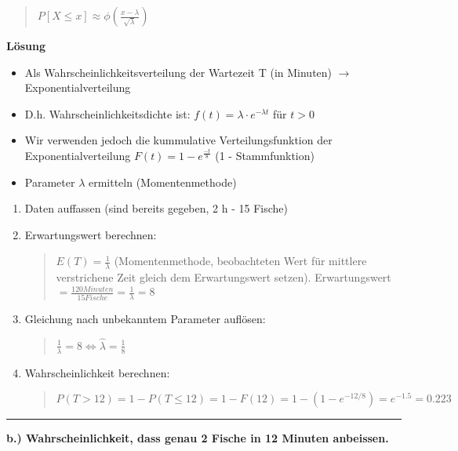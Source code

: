 \documentclass[11pt]{article}
\providecommand{\tightlist}{%
      \setlength{\itemsep}{0pt}\setlength{\parskip}{0pt}}
\begin{document}
\begin{quote}
\(P[X \leq x] \approx \phi(\frac{x - \lambda}{\sqrt{\lambda}})\)
\end{quote}

\textbf{Lösung}

\begin{itemize}
\tightlist
\item
  Als Wahrscheinlichkeitsverteilung der Wartezeit T (in Minuten) \(\to\)
  Exponentialverteilung
\item
  D.h. Wahrscheinlichkeitsdichte ist:
  \(f(t) = \lambda \cdot e^{-\lambda t}\) für \(t > 0\)
\item
  Wir verwenden jedoch die kummulative Verteilungsfunktion der
  Exponentialverteilung \(F(t) = 1 - e^{\frac{-t}{8}}\) (1 -
  Stammfunktion)
\item
  Parameter \(\lambda\) ermitteln (Momentenmethode)
\end{itemize}

\begin{enumerate}
\def\labelenumi{\arabic{enumi}.}
\item
  Daten auffassen (sind bereits gegeben, 2 h - 15 Fische)
\item
  Erwartungswert berechnen:

  \begin{quote}
  \(E(T) = \frac{1}{\lambda}\) (Momentenmethode, beobachteten Wert für
  mittlere verstrichene Zeit gleich dem Erwartungswert setzen).
  Erwartungswert
  \(= \frac{120 Minuten}{15 Fische} = \frac{1}{\lambda} = 8\)
  \end{quote}
\item
  Gleichung nach unbekanntem Parameter auflösen:

  \begin{quote}
  \(\frac{1}{\lambda} = 8 \Leftrightarrow \hat{\lambda} = \frac{1}{8}\)
  \end{quote}
\item
  Wahrscheinlichkeit berechnen:

  \begin{quote}
  \(P(T > 12) = 1 - P(T \leq 12) = 1 - F(12) = 1 - (1 - e^{-12/8}) = e^{-1.5} = 0.223\)
  \end{quote}
\end{enumerate}

\begin{center}\rule{0.5\linewidth}{\linethickness}\end{center}

\textbf{b.) Wahrscheinlichkeit, dass genau 2 Fische in 12 Minuten
anbeissen.}
\end{document}
